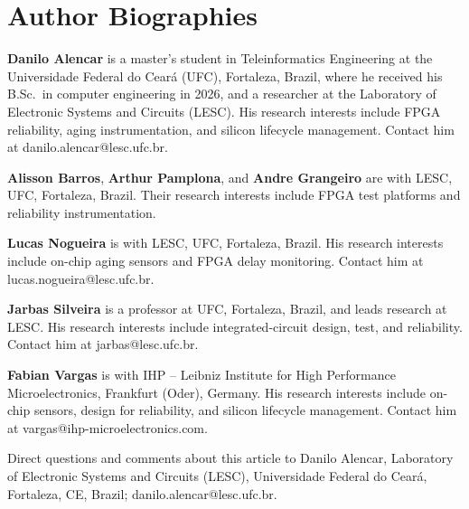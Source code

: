 \documentclass[10pt,twocolumn]{article}
\begin{document}
\section*{Author Biographies}
\footnotesize
\noindent\textbf{Danilo Alencar} is a master's student in Teleinformatics Engineering at the Universidade Federal do Cear\'a (UFC), Fortaleza, Brazil, where he received his B.Sc.\ in computer engineering in 2026, and a researcher at the Laboratory of Electronic Systems and Circuits (LESC). His research interests include FPGA reliability, aging instrumentation, and silicon lifecycle management. Contact him at danilo.alencar@lesc.ufc.br.

\smallskip\noindent\textbf{Alisson Barros}, \textbf{Arthur Pamplona}, and \textbf{Andre Grangeiro} are with LESC, UFC, Fortaleza, Brazil. Their research interests include FPGA test platforms and reliability instrumentation.

\smallskip\noindent\textbf{Lucas Nogueira} is with LESC, UFC, Fortaleza, Brazil. His research interests include on-chip aging sensors and FPGA delay monitoring. Contact him at lucas.nogueira@lesc.ufc.br.

\smallskip\noindent\textbf{Jarbas Silveira} is a professor at UFC, Fortaleza, Brazil, and leads research at LESC. His research interests include integrated-circuit design, test, and reliability. Contact him at jarbas@lesc.ufc.br.

\smallskip\noindent\textbf{Fabian Vargas} is with IHP -- Leibniz Institute for High Performance Microelectronics, Frankfurt (Oder), Germany. His research interests include on-chip sensors, design for reliability, and silicon lifecycle management. Contact him at vargas@ihp-microelectronics.com.

\medskip\noindent Direct questions and comments about this article to Danilo Alencar, Laboratory of Electronic Systems and Circuits (LESC), Universidade Federal do Cear\'a, Fortaleza, CE, Brazil; danilo.alencar@lesc.ufc.br.
\end{document}
